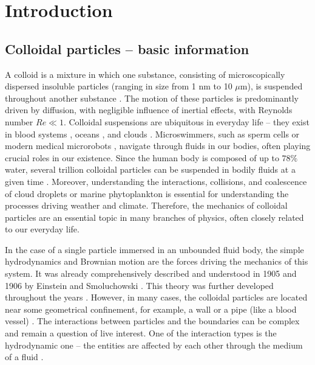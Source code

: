 \documentclass{master_thesis}
\begin{document}
\tableofcontents

\chapter{Introduction}

\section{Colloidal particles -- basic information}

A colloid is a mixture in which one substance, consisting of microscopically dispersed insoluble particles (ranging in size from 1 nm to 10 $\mu$m), is suspended throughout another substance \cite{wikipedia_colloids}. The motion of these particles is predominantly driven by diffusion, with negligible influence of inertial effects, with Reynolds number $Re \ll 1$. Colloidal suspensions are ubiquitous in everyday life \cite{kim_2010,wu_2017,fuller_2022} -- they exist in blood systems \cite{fedosov_2012,takeishi_2017}, oceans \cite{jokulsdottir_2016,slomka_2020,jiang_2020,leiva_2022}, and clouds \cite{wang_2008,grabowski_2013,fries_2017,gustavsson_2021}. Microswimmers, such as sperm cells or modern medical microrobots \cite{balzani_2000,lauga_2008,cholakova_2021}, navigate through fluids in our bodies, often playing crucial roles in our existence. Since the human body is composed of up to $78\%$ water, several trillion colloidal particles can be suspended in bodily fluids at a given time \cite{alberts_2003}. Moreover, understanding the interactions, collisions, and coalescence of cloud droplets or marine phytoplankton is essential for understanding the processes driving weather and climate. Therefore, the mechanics of colloidal particles are an essential topic in many branches of physics, often closely related to our everyday life.

In the case of a single particle immersed in an unbounded fluid body, the simple hydrodynamics and Brownian motion are the forces driving the mechanics of this system. It was already comprehensively described and understood in 1905 and 1906 by Einstein \cite{einstein1905,einstein1906} and Smoluchowski \cite{smoluchowski1906}. This theory was further developed throughout the years \cite{fokker1914,planck1917,langevin1908,ito1951}. However, in many cases, the colloidal particles are located near some geometrical confinement, for example, a wall or a pipe (like a blood vessel) \cite{verweij2021,han_2019}. The interactions between particles and the boundaries can be complex and remain a question of live interest. One of the interaction types is the hydrodynamic one -- the entities are affected by each other through the medium of a fluid \cite{kim_karilla,blake1971,cichocki1998,cichocki2000,lisicki_nagele_2016,lisicki2016}. 
\end{document}
